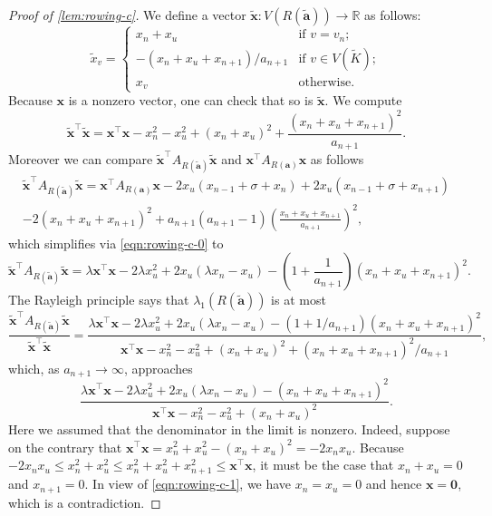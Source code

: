 \documentclass[11pt]{article}
\theoremstyle{definition}
\theoremstyle{remark}
\newcommand{\la}{\lambda}
\newcommand{\R}{\mathbb{R}}
\newcommand{\ba}{\bm{a}}
\newcommand{\tba}{\tilde{\ba}}
\newcommand{\bx}{\bm{x}}
\newcommand{\tx}{\tilde{x}}
\newcommand{\tbx}{\tilde{\bx}}
\begin{document}
\begin{proof}[Proof of \ref{lem:rowing-c}]
    We define a vector $\tbx\colon V(R(\tba))\to\R$ as follows:
    \[
        \tx_v = \begin{cases}
            x_n + x_u & \text{if } v = v_n; \\
            -(x_n + x_u + x_{n+1})/a_{n+1} & \text{if } v \in V(\tilde{K}); \\
            x_v & \text{otherwise}.
        \end{cases}
    \]
    Because $\bx$ is a nonzero vector, one can check that so is $\tbx$. We compute
    \[
        \tbx^\intercal \tbx = \bx^\intercal \bx - x_n^2 - x_u^2 + (x_n + x_u)^2 + \frac{(x_n + x_u + x_{n+1})^2}{a_{n+1}}.
    \]
    Moreover we can compare $\tbx^\intercal A_{R(\tba)} \tbx$ and $\bx^\intercal A_{R(\ba)} \bx$ as follows
    \begin{multline*}
        \tbx^\intercal A_{R(\tba)} \tbx = \bx^\intercal A_{R(\ba)} \bx - 2x_u\left(x_{n-1} + \sigma + x_n\right) + 2x_u\left(x_{n-1} + \sigma + x_{n+1} \right) \\
        - 2(x_n + x_u + x_{n+1})^2 + a_{n+1}(a_{n+1}-1)\left(\frac{x_n + x_u + x_{n+1}}{a_{n+1}}\right)^2,
    \end{multline*}
    which simplifies via \eqref{eqn:rowing-c-0} to
    \[
        \tbx^\intercal A_{R(\tba)} \tbx = \la \bx^\intercal \bx - 2\la x_u^2 + 2x_u (\la x_n - x_u) - \left(1 + \frac{1}{a_{n+1}}\right)(x_n + x_u + x_{n+1})^2.
    \]
    The Rayleigh principle says that $\la_1(R(\tba))$ is at most
    \[
        \frac{\tbx^\intercal A_{R(\tba)} \tbx}{\tbx^\intercal \tbx} = \frac{\la \bx^\intercal \bx - 2\la x_u^2 + 2x_u (\la x_n - x_u) - \left(1 + 1/a_{n+1}\right)(x_n + x_u + x_{n+1})^2}{\bx^\intercal \bx - x_n^2 - x_u^2 + (x_n + x_u)^2 + (x_n + x_u + x_{n+1})^2/a_{n+1}},
    \]
    which, as $a_{n+1} \to \infty$, approaches
    \[
        \frac{\la \bx^\intercal \bx - 2\la x_u^2 + 2x_u(\la x_n - x_u) - (x_n + x_u + x_{n+1})^2}{\bx^\intercal \bx - x_n^2 - x_u^2 + (x_n + x_u)^2}.
    \]
    Here we assumed that the denominator in the limit is nonzero. Indeed, suppose on the contrary that $\bx^\intercal \bx = x_n^2 + x_u^2 - (x_n + x_u)^2 = -2x_nx_u$. Because $-2x_nx_u \le x_n^2 + x_u^2 \le x_n^2 + x_u^2 + x_{n+1}^2 \le \bx^\intercal \bx$, it must be the case that $x_n + x_u = 0$ and $x_{n+1} = 0$. In view of \eqref{eqn:rowing-c-1}, we have $x_n = x_u = 0$ and hence $\bx = \bm{0}$, which is a contradiction.
    

\end{proof}
\end{document}
